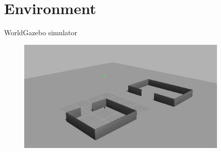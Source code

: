 \section{Environment}

\begin{frame}{World}{Gazebo simulator}

\begin{figure}
\centering
\includegraphics[width = 0.9\textwidth]{./screenshot/Gazebo.png}
\end{figure}

\end{frame}

